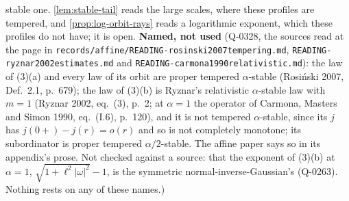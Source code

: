 \begin{proposition}
{stable one. \ref{lem:stable-tail} reads the large scales, where these profiles are tempered, and
\ref{prop:log-orbit-rays} reads a logarithmic exponent, which these profiles do not have; it is
open. \textbf{Named, not used} (Q-0328, the sources read at the page in
\texttt{records/affine/READING-rosinski2007tempering.md}, \texttt{READING-ryznar2002estimates.md} and
\texttt{READING-carmona1990relativistic.md}): the law of (3)(a) and every law of its orbit are proper
tempered $\alpha$-stable (Rosi\'nski 2007, Def.~2.1, p.~679); the law of (3)(b) is Ryznar's relativistic
$\alpha$-stable law with $m = 1$ (Ryznar 2002, eq.~(3), p.~2; at $\alpha = 1$ the operator of
Carmona, Masters and Simon 1990, eq.~(I.6), p.~120), and it is not tempered $\alpha$-stable, since its
$j$ has $j(0{+}) - j(r) = o(r)$ and so is not completely monotone; its subordinator is proper tempered
$\alpha/2$-stable. The affine paper says so in its appendix's prose. Not checked against a source: that
the exponent of (3)(b) at $\alpha = 1$, $\sqrt{1 + \ell^2|\omega|^2} - 1$, is the symmetric
normal-inverse-Gaussian's (Q-0263). Nothing rests on any of these names.)}
\end{proposition}


